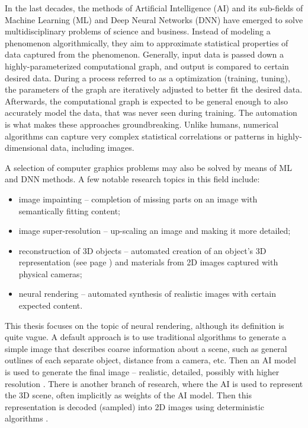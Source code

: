 In the last decades, the methods of Artificial Intelligence (AI) and its sub-fields of Machine Learning (ML) and Deep Neural Networks (DNN) have emerged to solve multidisciplinary problems of science and business. Instead of modeling a phenomenon algorithmically, they aim to approximate statistical properties of data captured from the phenomenon. Generally, input data is passed down a highly-parameterized computational graph, and output is compared to certain desired data. During a process referred to as a optimization (training, tuning), the parameters of the graph are iteratively adjusted to better fit the desired data. Afterwards, the computational graph is expected to be general enough to also accurately model the data, that was never seen during training. The automation is what makes these approaches groundbreaking. Unlike humans, numerical algorithms can capture very complex statistical correlations or patterns in highly-dimensional data, including images.

A selection of computer graphics problems may also be solved by means of ML and DNN methods. A few notable research topics in this field include:
\begin{itemize}
\item image impainting -- completion of missing parts on an image with semantically fitting content;
\item image super-resolution -- up-scaling an image and making it more detailed;
\item reconstruction of 3D objects -- automated creation of an object's 3D representation (see page \pageref{intro:3d-representations-paragraph}) and materials from 2D images captured with physical cameras;
\item neural rendering -- automated synthesis of realistic images with certain expected content.
\end{itemize}

This thesis focuses on the topic of neural rendering, although its definition is quite vague. A default approach is to use traditional algorithms to generate a simple image that describes coarse information about a scene, such as general outlines of each separate object, distance from a camera, etc. Then an AI model is used to generate the final image -- realistic, detailed, possibly with higher resolution \cite{dnn:deferred19}. There is another branch of research, where the AI is used to represent the 3D scene, often implicitly as weights of the AI model. Then this representation is decoded (sampled) into 2D images using deterministic algorithms \cite{dnn:nerf20}.
 
